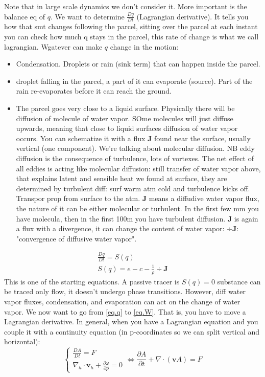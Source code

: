 Note that in large scale dynamics we don't consider it. More important is the balance eq of $q$.
We want to determine $\frac{Dq}{Dt}$ (Lagrangian derivative). It tells you how that smt changes following the parcel, sitting over the parcel at each instant you can check how much q stays in the parcel, this rate of change is what we call lagrangian. Wgatever can make $q$ change in the motion:
\begin{itemize}
    \item Condensation. Droplets or rain (sink term) that can happen inside the parcel.
    \item droplet falling in the parcel, a part of it can evaporate (source). Part of the rain re-evaporates before it can reach the ground. 
    \item The parcel goes very close to a liquid surface. Physically there will be diffusion of molecule of water vapor. SOme molecules will just diffuse upwards, meaning that close to liquid surfaces diffusion of water vapor occurs. You can schematize it with a flux $\mathbf{J}$ found near the surface, usually vertical (one component). We're talking about molecular diffusion. NB eddy diffusion is the consequence of turbulence, lots of vortexes. The net effect of all eddies is acting like molecular diffusion: still transfer of water vapor above, that explains latent and sensible heat we found at surface, they are determined by turbulent diff: surf warm atm cold and turbulence kicks off. Transpor prop from surface to the atm. $\mathbf{J}$ means a diffudive water vapor flux, the nature of it can be either molecular or turbulent. In the first few mm you have molecula, then in the first 100m you have turbulent diffusion. $\mathbf{J}$ is again a flux with a divergence, it can change the content of water vapor: $\div{\mathbf{J}}$: "convergence of diffusive water vapor".
\end{itemize}
\begin{align}\label{eq.q}
    \frac{Dq}{Dt}=S(q)\\
    S(q)=e-c-\frac{1}{\rho}\div{\mathbf{J}}
\end{align}
This is one of the starting equations. A passive tracer is $S(q)=0$ substance can be traced only flow, it doesn't undergo phase transitions. However, diff water vapor fluxes, condensation, and evaporation can act on the change of water vapor. 
We now want to go from \eqref{eq.q} to \eqref{eq.W}. That is, you have to move a Lagrangian derivative. In general, when you have a Lagrangian equation and you couple it with a continuity equation (in p-coordinates so we can split vertical and horizontal):
\begin{equation}
    \begin{cases}
    \frac{DA}{Dt}=F\\
    \nabla_h\cdot \mathbf{v}_h+\frac{\partial\omega}{\partial p}=0 
\end{cases}\Leftrightarrow \frac{\partial A}{\partial t}+\nabla\cdot(\mathbf{v}A)=F
\end{equation}


